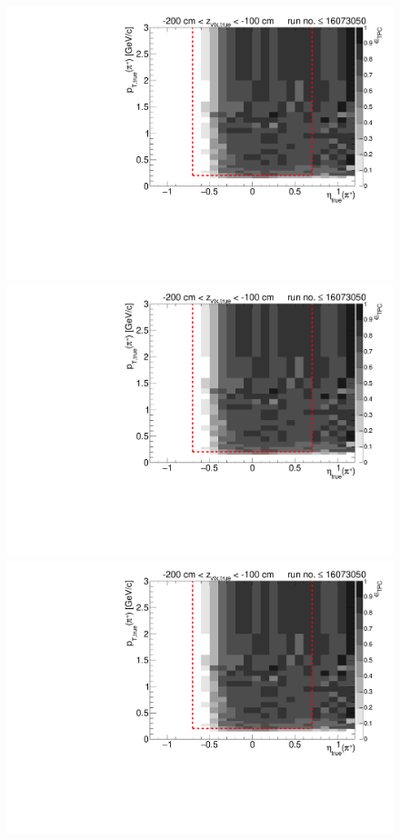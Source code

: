 \begin{figure}[hb]\ContinuedFloat
\centering
\parbox{0.495\textwidth}{
  \centering
  \includegraphics[width=\linewidth,page=11]{graphics/eff/Eff2D_TPC_pion_Plus_RunRange1.pdf}\\
  \includegraphics[width=\linewidth,page=13]{graphics/eff/Eff2D_TPC_pion_Plus_RunRange1.pdf}\\
  \includegraphics[width=\linewidth,page=15]{graphics/eff/Eff2D_TPC_pion_Plus_RunRange1.pdf}\\
}
\end{figure}
